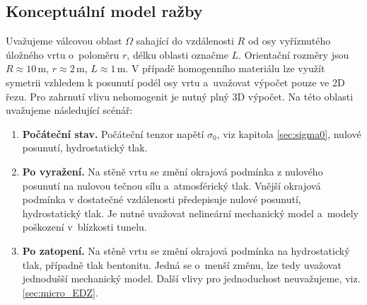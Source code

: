 \documentclass{article}
\def\jb#1{}
\newcommand{\sy}[1]{}
\begin{document}
\subsection{Konceptuální model ražby}
Uvažujeme válcovou oblast $\Omega$ sahající do vzdálenosti $R$ od osy vyříznutého úložného vrtu o~poloměru $r$, délku oblasti označme $L$. Orientační rozměry jsou $R\approx 10\,\mathrm{m}$, $r\approx 2\,\mathrm{m}$, $L\approx 1\,\mathrm{m}$. V případě homogenního materiálu lze využít symetrii vzhledem k posunutí podél osy vrtu a~uvažovat výpočet pouze ve 2D řezu. Pro zahrnutí vlivu nehomogenit je nutný plný 3D výpočet. Na této oblasti uvažujeme následující scénář:

\begin{enumerate}
\item {\bf Počáteční stav.} Počáteční tenzor napětí $\sigma_0$, viz kapitola \ref{sec:sigma0}, nulové posunutí, hydrostatický tlak.
                       
\item {\bf Po vyražení.} Na stěně vrtu se změní okrajová podmínka z nulového posunutí na nulovou tečnou sílu
                         a~atmosférický tlak. Vnější okrajová podmínka v dostatečné vzdálenosti předepisuje nulové posunutí, hydrostatický tlak.
                         Je nutné uvažovat nelineární mechanický model a~modely poškození v~blízkosti tunelu. 
                         

                         
\item {\bf Po zatopení.} Na stěně vrtu se změní okrajová podmínka na hydrostatický tlak, případně tlak bentonitu. Jedná se o~menší změnu, lze tedy uvažovat jednodušší mechanický model. Další vlivy pro jednoduchost neuvažujeme, viz. \ref{sec:micro_EDZ}.
                        
\end{enumerate}
\end{document}
